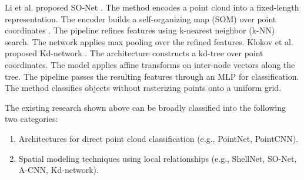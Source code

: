 \begin{deletedblock}
  Li et al. proposed SO-Net \cite{Li_2018_CVPR}.
    The method encodes a point cloud into a fixed-length representation.
    The encoder builds a self-organizing map (SOM) over point coordinates \cite{58325}.
    The pipeline refines features using k-nearest neighbor (k-NN) search.
    The network applies max pooling over the refined features.
  Klokov et al. proposed Kd-network \cite{8237361}.
    The architecture constructs a kd-tree over point coordinates.
    The model applies affine transforms on inter-node vectors along the tree.
    The pipeline passes the resulting features through an MLP for classification.
    The method classifies objects without rasterizing points onto a uniform grid.
\end{deletedblock}

The existing research shown above can be broadly classified into the following two categories:
\begin{enumerate}
  \item Architectures for direct point cloud classification (e.g., PointNet, PointCNN).
  \item Spatial modeling techniques using local relationships (e.g., ShellNet, SO-Net, A-CNN, Kd-network).
\end{enumerate}

